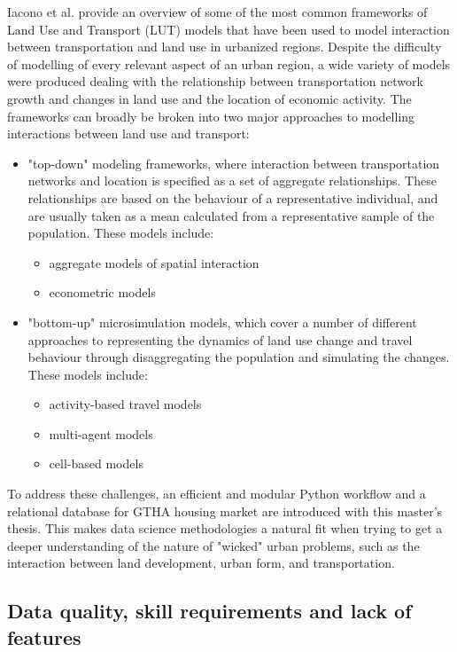 Iacono et al.
\cite{Iacono2008} provide an overview of some of the most common frameworks of Land Use and Transport (LUT) models that have been used to model interaction between transportation and land use in urbanized regions.
Despite the difficulty of modelling of every relevant aspect of an urban region, a wide variety of models were produced dealing with the relationship between transportation network growth and changes in land use and the location of economic activity.
The frameworks can broadly be broken into two major approaches to modelling interactions between land use and transport:
\begin{itemize}
    \item "top-down" modeling frameworks, where interaction between transportation networks and location is specified as a set of aggregate relationships.
    These relationships are based on the behaviour of a representative individual, and are usually taken as a mean calculated from a representative sample of the population.
    These models include:
    \begin{itemize}
        \item aggregate models of spatial interaction
        \item econometric models
    \end{itemize}
    \item "bottom-up" microsimulation models, which cover a number of different approaches to representing the dynamics of land use change and travel behaviour through disaggregating the population and simulating the changes.
    These models include:
    \begin{itemize}
        \item activity-based travel models
        \item multi-agent models
        \item cell-based models
    \end{itemize}
\end{itemize}


To address these challenges, an efficient and modular Python workflow and a relational database for GTHA housing market are introduced with this master's thesis.
This makes data science methodologies a natural fit when trying to get a deeper understanding of the nature of "wicked" urban problems, such as the interaction between land development, urban form, and transportation.

\subsection{Data quality, skill requirements and lack of features} \label{subsec:challenges_quality_skills_features}

